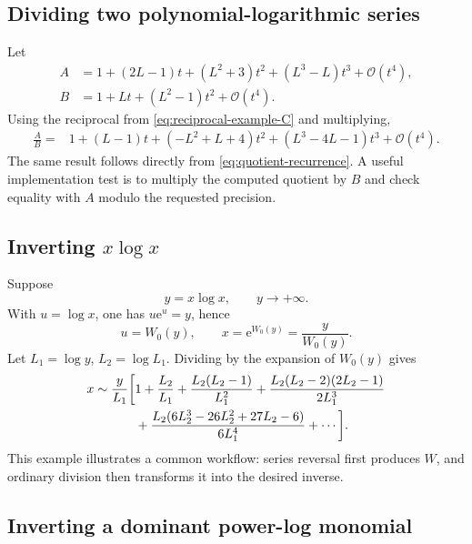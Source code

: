 \documentclass[11pt]{article}
\theoremstyle{pltheorem}
\newcommand{\e}{\mathrm e}
\newcommand{\bigO}{\mathcal O}
\begin{document}
\subsection{Dividing two polynomial-logarithmic series}

Let
\begin{align*}
 A&=1+(2L-1)t+(L^2+3)t^2+(L^3-L)t^3+\bigO(t^4),\\
 B&=1+Lt+(L^2-1)t^2+\bigO(t^4).
\end{align*}
Using the reciprocal from \cref{eq:reciprocal-example-C} and multiplying,
\begin{align}
 \frac AB={}&1+(L-1)t+(-L^2+L+4)t^2
 +(L^3-4L-1)t^3+\bigO(t^4).
 \label{eq:worked-quotient}
\end{align}
The same result follows directly from \cref{eq:quotient-recurrence}.  A useful implementation test is to multiply the computed quotient by \(B\) and check equality with \(A\) modulo the requested precision.

\subsection{\texorpdfstring{Inverting \(x\log x\)}{Inverting x log x}}

Suppose
\begin{equation}\label{eq:xlogx-equation}
 y=x\log x,
 \qquad y\to+\infty.
\end{equation}
With \(u=\log x\), one has \(u\e^u=y\), hence
\begin{equation}\label{eq:xlogx-exact}
 u=W_0(y),
 \qquad
 x=\e^{W_0(y)}=\frac{y}{W_0(y)}.
\end{equation}
Let \(L_1=\log y\), \(L_2=\log L_1\).  Dividing by the expansion of \(W_0(y)\) gives
\begin{align}
 x\sim\frac{y}{L_1}\bigg[{}&1+\frac{L_2}{L_1}
 +\frac{L_2(L_2-1)}{L_1^2}
 +\frac{L_2(L_2-2)(2L_2-1)}{2L_1^3}
 \notag\\
 &+\frac{L_2(6L_2^3-26L_2^2+27L_2-6)}{6L_1^4}
 +\cdots\bigg].
 \label{eq:xlogx-inverse-expansion}
\end{align}
This example illustrates a common workflow: series reversal first produces \(W\), and ordinary division then transforms it into the desired inverse.

\subsection{Inverting a dominant power-log monomial}
\end{document}
